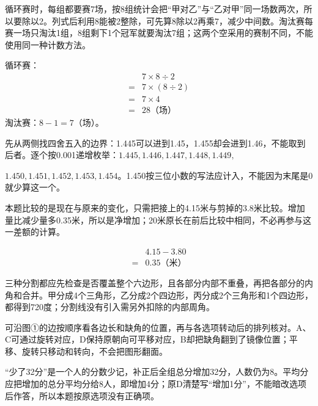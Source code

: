 \documentclass[multi=snippet,border=0pt]{standalone}
\newenvironment{snippet}[3]{\begin{minipage}{#1bp}\color{answerred}\fontsize{#2}{#3}\selectfont\raggedright}{\end{minipage}}
\begin{document}
\begin{snippet}{505}{11.5}{14}循环赛时，每组都要赛7场，按8组统计会把“甲对乙”与“乙对甲”同一场数两次，所以要除以2。列式后利用8能被2整除，可先算8除以2再乘7，减少中间数。淘汰赛每赛一场只淘汰1组，8组剩下1个冠军就要淘汰7组；这两个空采用的赛制不同，不能使用同一种计数方法。\par 循环赛：\[\begin{aligned}&7\times8\div2\\={}&7\times(8\div2)\\={}&7\times4\\={}&28\text{（场）}\end{aligned}\]淘汰赛：\(8-1=7\)（场）。\end{snippet}
\begin{snippet}{505}{11.5}{14}先从两侧找四舍五入的边界：1.445可以进到1.45，1.455却会进到1.46，不能取到后者。逐个按0.001递增枚举：\(1.445,1.446,1.447,1.448,1.449,\)\par \(1.450,1.451,1.452,1.453,1.454\)。1.450按三位小数的写法应计入，不能因为末尾是0就少算这一个。\end{snippet}
\begin{snippet}{505}{11.5}{14}本题比较的是现在与原来的变化，只需把接上的4.15米与剪掉的3.8米比较。增加量比减少量多0.35米，所以是净增加；20米原长在前后比较中相同，不必再参与这一差额的计算。\par \[\begin{aligned}&4.15-3.80\\={}&0.35\text{（米）}\end{aligned}\]\end{snippet}
\begin{snippet}{505}{11.5}{14}三种分割都应先检查是否覆盖整个六边形，且各部分内部不重叠，再把各部分的内角和合并。甲分成4个三角形，乙分成2个四边形，丙分成2个三角形和1个四边形，都得到720度；分割线没有引入需另外扣除的内部周角。\end{snippet}
\begin{snippet}{505}{11.5}{14}可沿图①的边按顺序看各边长和缺角的位置，再与各选项转动后的排列核对。A、C可通过旋转对应，D保持原朝向可平移对应，B却把缺角翻到了镜像位置；平移、旋转只移动和转向，不会把图形翻面。\end{snippet}
\begin{snippet}{505}{11.5}{14}“少了32分”是一个人的分数少记，补正后全组总分增加32分，人数仍为8。平均分应把增加的总分平均分给8人，即增加4分；原D清楚写“增加1分”，不能暗改选项后作答，所以本题按原选项没有正确项。\end{snippet}
\end{document}
